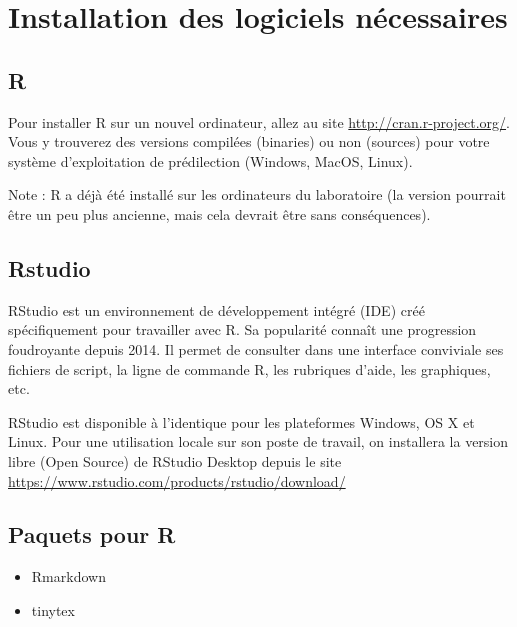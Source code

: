 \documentclass[12pt,]{book}
\providecommand{\tightlist}{%
  \setlength{\itemsep}{0pt}\setlength{\parskip}{0pt}}
\begin{document}
\hypertarget{installation-des-logiciels-nuxe9cessaires}{%
\section*{Installation des logiciels nécessaires}\label{installation-des-logiciels-nuxe9cessaires}}

\hypertarget{r}{%
\subsection*{R}\label{r}}

Pour installer R sur un nouvel ordinateur, allez au site \url{http://cran.r-project.org/}.
Vous y trouverez des versions compilées (binaries) ou non (sources) pour votre système d'exploitation de prédilection (Windows, MacOS, Linux).

Note : R a déjà été installé sur les ordinateurs du laboratoire (la version pourrait être un peu plus ancienne, mais cela devrait être sans conséquences).

\hypertarget{rstudio}{%
\subsection*{Rstudio}\label{rstudio}}

RStudio est un environnement de développement intégré (IDE) créé spécifiquement pour travailler avec R. Sa popularité connaît une progression foudroyante depuis 2014.
Il permet de consulter dans une interface conviviale ses fichiers de script, la ligne de commande R, les rubriques d'aide,
les graphiques, etc.

RStudio est disponible à l'identique pour les plateformes Windows, OS X et Linux.
Pour une utilisation locale sur son poste de travail, on installera la version libre (Open Source) de RStudio Desktop depuis le site
\url{https://www.rstudio.com/products/rstudio/download/}

\hypertarget{paquets-pour-r}{%
\subsection*{Paquets pour R}\label{paquets-pour-r}}

\begin{itemize}
\tightlist
\item
  Rmarkdown
\item
  tinytex
\end{itemize}
\end{document}
